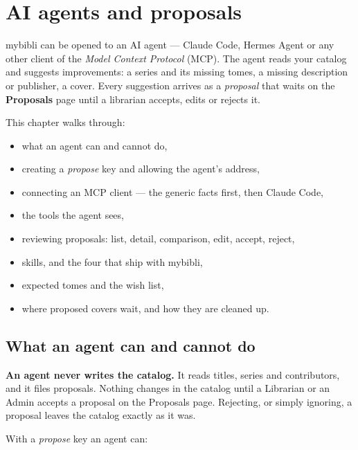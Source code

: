 \chapter{AI agents and proposals}
\label{ch:agents}

mybibli can be opened to an AI agent --- Claude Code, Hermes Agent or
any other client of the \emph{Model Context
Protocol} (MCP). The agent
reads your catalog and suggests improvements: a series and its missing
tomes, a missing description or publisher, a cover. Every suggestion
arrives as a \emph{proposal} that waits on the
\textbf{Proposals} page until a librarian accepts, edits or rejects
it.

This chapter walks through:

\begin{itemize}
  \item what an agent can and cannot do,
  \item creating a \emph{propose} key and allowing the agent's
        address,
  \item connecting an MCP client --- the generic facts first, then
        Claude Code,
  \item the tools the agent sees,
  \item reviewing proposals: list, detail, comparison, edit, accept,
        reject,
  \item skills, and the four that ship with mybibli,
  \item expected tomes and the wish list,
  \item where proposed covers wait, and how they are cleaned up.
\end{itemize}

\section{What an agent can and cannot do}
\label{sec:agents-scope}

\begin{note}
\textbf{An agent never writes the catalog.} It reads titles, series
and contributors, and it files proposals. Nothing changes in the
catalog until a Librarian or an Admin accepts a proposal on the
Proposals page. Rejecting, or simply ignoring, a proposal leaves the
catalog exactly as it was.
\end{note}

With a \emph{propose} key an agent can:

